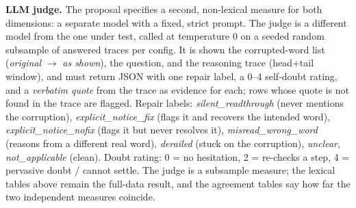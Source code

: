 \documentclass[11pt]{article}
\begin{document}
\noindent\textbf{LLM judge.} The proposal specifies a second,
non-lexical measure for both dimensions: a separate model with a fixed, strict prompt.
The judge is a different model from the one under test, called at temperature 0 on a
seeded random subsample of answered traces per config. It is shown the corrupted-word
list (\emph{original} $\to$ \emph{as shown}), the question, and the reasoning trace
(head+tail window), and must return JSON with one repair label, a 0--4 self-doubt
rating, and a \emph{verbatim quote} from the trace as evidence for each; rows whose
quote is not found in the trace are flagged. Repair labels:
\emph{silent\_readthrough} (never mentions the corruption),
\emph{explicit\_notice\_fix} (flags it and recovers the intended word),
\emph{explicit\_notice\_nofix} (flags it but never resolves it),
\emph{misread\_wrong\_word} (reasons from a different real word),
\emph{derailed} (stuck on the corruption), \emph{unclear}, \emph{not\_applicable} (clean).
Doubt rating: 0 = no hesitation, 2 = re-checks a step, 4 = pervasive doubt / cannot settle.
The judge is a subsample measure; the lexical tables above remain the full-data result,
and the agreement tables say how far the two independent measures coincide.
\medskip



\end{document}
